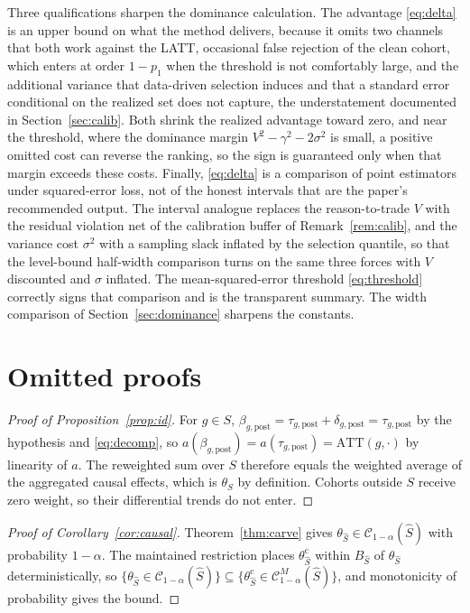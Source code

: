 \documentclass[12pt]{article}
\theoremstyle{remark}
\begin{document}
Three qualifications sharpen the dominance calculation. The advantage \eqref{eq:delta} is an upper bound
on what the method delivers, because it omits two channels that both work against the
LATT, occasional false rejection of the clean cohort, which enters at order
$1-p_1$ when the threshold is not comfortably large, and the additional variance that
data-driven selection induces and that a standard error conditional on the realized
set does not capture, the understatement documented in Section~\ref{sec:calib}. Both
shrink the realized advantage toward zero, and near the threshold, where the dominance margin
$V^2-\gamma^2-2\sigma^2$ is small, a positive omitted cost can reverse the ranking, so the sign is
guaranteed only when that margin exceeds these costs. Finally,
\eqref{eq:delta} is a comparison of point estimators under squared-error loss, not of
the honest intervals that are the paper's recommended output. The interval analogue
replaces the reason-to-trade $V$ with the residual violation net of the calibration
buffer of Remark~\ref{rem:calib}, and the variance cost $\sigma^2$ with a sampling
slack inflated by the selection quantile, so that the level-bound half-width comparison
turns on the same three forces with $V$ discounted and $\sigma$ inflated. The
mean-squared-error threshold \eqref{eq:threshold} correctly signs that comparison and
is the transparent summary. The width comparison of Section~\ref{sec:dominance} sharpens the
constants.

\section{Omitted proofs}\label{app:proofs}

\begin{proof}[Proof of Proposition~\ref{prop:id}]
For $g\in S$, $\beta_{g,\mathrm{post}} = \tau_{g,\mathrm{post}}+\delta_{g,\mathrm{post}}
= \tau_{g,\mathrm{post}}$ by the hypothesis and \eqref{eq:decomp}, so $a(\beta_{g,\mathrm{post}})
= a(\tau_{g,\mathrm{post}}) = \mathrm{ATT}(g,\cdot)$ by linearity of $a$. The reweighted sum over $S$
therefore equals the weighted average of the aggregated causal effects, which is $\theta_S$ by definition.
Cohorts outside $S$ receive zero weight, so their differential trends do not enter.
\end{proof}

\begin{proof}[Proof of Corollary~\ref{cor:causal}]
Theorem~\ref{thm:carve} gives $\theta_{\hat S}\in\mathcal C_{1-\alpha}(\hat S)$ with probability $1-\alpha$.
The maintained restriction places $\theta_{\hat S}^{\mathrm c}$ within $B_{\hat S}$ of $\theta_{\hat S}$
deterministically, so $\{\theta_{\hat S}\in\mathcal C_{1-\alpha}(\hat S)\}\subseteq\{\theta_{\hat S}^{\mathrm c}\in
\mathcal C^{M}_{1-\alpha}(\hat S)\}$, and monotonicity of probability gives the bound.
\end{proof}
\end{document}
